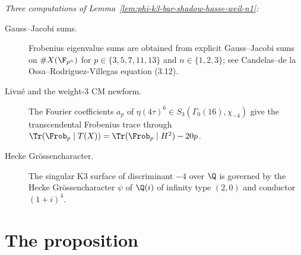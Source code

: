 \noindent\textit{Three computations of Lemma~\ref{lem:phi-k3-bar-shadow-hasse-weil-n1}:}

\begin{description}
\item[Gauss--Jacobi sums.]
Frobenius eigenvalue sums are obtained from explicit Gauss--Jacobi sums
on $\# X(\F_{p^n})$ for $p \in \{3, 5, 7, 11, 13\}$ and
$n \in \{1, 2, 3\}$; see Candelas--de la Ossa--Rodriguez-Villegas
equation (3.12).

\item[Livn\'e and the weight-$3$ CM newform.]
The Fourier coefficients $a_p$ of
$\eta(4\tau)^6 \in S_3(\Gamma_0(16), \chi_{-4})$ give the transcendental
Frobenius trace through
$\Tr(\Frob_p \mid T(X)) = \Tr(\Frob_p \mid H^2) - 20p$.

\item[Hecke Gr\"ossencharacter.]
The singular K3 surface of discriminant $-4$ over $\Q$ is governed by
the Hecke Gr\"ossencharacter $\psi$ of $\Q(i)$ of infinity type $(2,0)$
and conductor $(1+i)^4$.
\end{description}


\section{The proposition}
\label{sec:padic-fermat-proposition}


